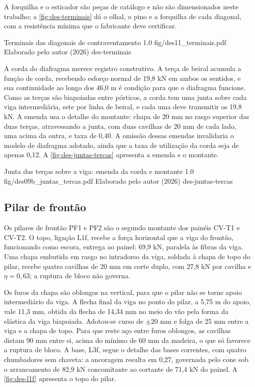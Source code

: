 A forquilha e o esticador são peças de catálogo e não são dimensionados neste
trabalho; a \autoref{fig:des-terminais} dá o olhal, o pino e a forquilha de cada
diagonal, com a resistência mínima que o fabricante deve certificar.


\figura
{Terminais das diagonais de contraventamento}
{1.0}
{fig/des11_terminais.pdf}
{Elaborado pelo autor (2026)}
{des-terminais}
{}
{}

A corda do diafragma merece registro construtivo. A terça de beiral acumula a
função de corda, recebendo esforço normal de 19,8 kN em ambos os sentidos, e sua
continuidade ao longo dos 46,0 m é condição para que o diafragma funcione. Como
as terças são biapoiadas entre pórticos, a corda tem uma junta sobre cada viga
intermediária, sete por linha de beiral, e cada uma deve transmitir os 19,8 kN.
A emenda usa o detalhe do montante: chapa de 20 mm no rasgo superior das duas
terças, atravessando a junta, com duas cavilhas de 20 mm de cada lado, uma acima
da outra, e taxa de 0,40. A omissão dessas emendas invalidaria o modelo de
diafragma adotado, ainda que a taxa de utilização da corda seja de apenas 0,12. A
\autoref{fig:des-juntas-tercas} apresenta a emenda e o montante.

\figura
{Junta das terças sobre a viga: emenda da corda e montante}
{1.0}
{fig/des09b_juntas_tercas.pdf}
{Elaborado pelo autor (2026)}
{des-juntas-tercas}
{}
{}

\subsection{Pilar de frontão}\label{ssec:pilar-frontao}

Os pilares de frontão PF1 e PF2 são o segundo montante dos painéis CV-T1 e CV-T2.
O topo, ligação L1f, recebe a força horizontal que a viga do frontão, funcionando
como escora, entrega ao painel: 69,9 kN, paralela às fibras da viga. Uma chapa
embutida em rasgo no intradorso da viga, soldada à chapa de topo do pilar, recebe
quatro cavilhas de 20 mm em corte duplo, com 27,8 kN por cavilha e
$\eta = 0{,}63$; a ruptura de bloco não governa.

Os furos da chapa são oblongos na vertical, para que o pilar não se torne apoio
intermediário da viga. A flecha final da viga no ponto do pilar, a 5,75 m do
apoio, vale 11,3 mm, obtida da flecha de 14,34 mm no meio do vão pela forma da
elástica da viga biapoiada. Adotou-se curso de $\pm 20$ mm e folga de 25 mm entre a
viga e a chapa de topo. Para que reste aço entre furos oblongos, as cavilhas
distam 90 mm entre si, acima do mínimo de 60 mm da madeira, o que só favorece a
ruptura de bloco. A base, L3f, segue o detalhe das bases correntes, com quatro
chumbadores sem chaveta: a ancoragem resulta em 0,27, governada pelo cone sob o
arrancamento de 82,9 kN concomitante ao cortante de 71,4 kN do painel. A
\autoref{fig:des-l1f} apresenta o topo do pilar.


